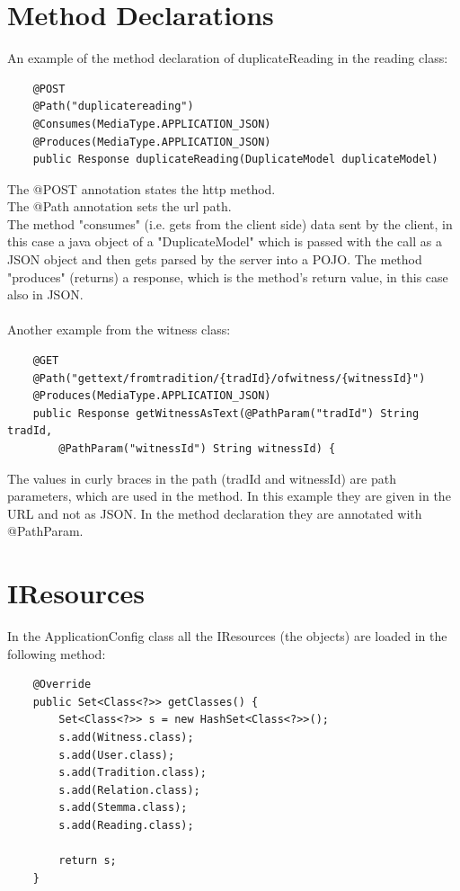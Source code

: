 \documentclass[11pt,fleqn,openany]{book} %
\begin{document}
\section*{Method Declarations}
An example of the method declaration of duplicateReading in the reading class:

\begin{lstlisting}
	@POST
	@Path("duplicatereading")
	@Consumes(MediaType.APPLICATION_JSON)
	@Produces(MediaType.APPLICATION_JSON)
	public Response duplicateReading(DuplicateModel duplicateModel)
\end{lstlisting}

The @POST annotation states the http method.\\
The @Path annotation sets the url path.\\
The method "consumes" (i.e. gets from the client side) data sent by the client, in this case a java object of a "DuplicateModel" which is passed with the call as a JSON object and then gets parsed by the server into a POJO. The method "produces" (returns) a response, which is the method's return value, in this case also in JSON. 
\\\\
Another example from the witness class:

\begin{lstlisting}
	@GET
	@Path("gettext/fromtradition/{tradId}/ofwitness/{witnessId}")
	@Produces(MediaType.APPLICATION_JSON)
	public Response getWitnessAsText(@PathParam("tradId") String tradId,
		@PathParam("witnessId") String witnessId) {
\end{lstlisting}

The values in curly braces in the path (tradId and witnessId) are path parameters, which are used in the method. In this example they are given in the URL and not as JSON. In the method declaration they are annotated with @PathParam. 

\section*{IResources}
In the ApplicationConfig class all the IResources (the objects) are loaded in the following method:

\begin{lstlisting}
	@Override
	public Set<Class<?>> getClasses() {
		Set<Class<?>> s = new HashSet<Class<?>>();
		s.add(Witness.class);
		s.add(User.class);
		s.add(Tradition.class);
		s.add(Relation.class);
		s.add(Stemma.class);
		s.add(Reading.class);
		
		return s;
	}
\end{lstlisting}
\end{document}
